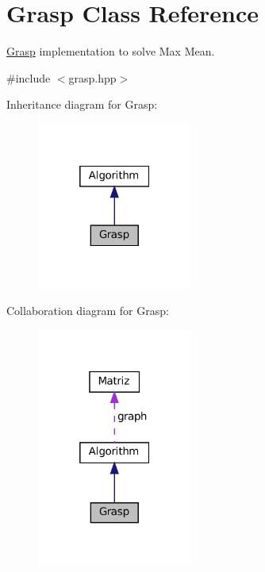 \hypertarget{classGrasp}{}\section{Grasp Class Reference}
\label{classGrasp}


\hyperlink{classGrasp}{Grasp} implementation to solve Max Mean.  




{\ttfamily \#include $<$grasp.\+hpp$>$}



Inheritance diagram for Grasp\+:\nopagebreak
\begin{figure}[H]
\begin{center}
\leavevmode
\includegraphics[width=145pt]{classGrasp__inherit__graph}
\end{center}
\end{figure}


Collaboration diagram for Grasp\+:\nopagebreak
\begin{figure}[H]
\begin{center}
\leavevmode
\includegraphics[width=145pt]{classGrasp__coll__graph}
\end{center}
\end{figure}
